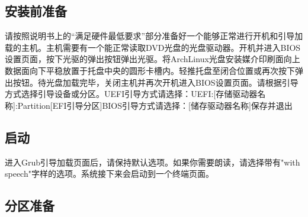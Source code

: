 \documentclass{article}
\newenvironment{singlecolumn}{%
	\par
	\noindent
	\begin{minipage}[t]{\textwidth} %
		\setlength{\parfillskip}{0pt plus 1fil} %
	}{%
	\end{minipage}
	\par
}
\begin{document}
\begin{singlecolumn}
	\vspace*{6\baselineskip} %
	\noindent %
\begin{tcolorbox}
\section*{安装前准备}
\end{tcolorbox}

请按照说明书上的“满足硬件最低要求”部分准备好一个能够正常进行开机和引导加载的主机。主机需要有一个能正常读取DVD光盘的光盘驱动器。开机并进入BIOS设置页面，按下光驱的弹出按钮弹出光驱。将ArchLinux光盘安装媒介印刷面向上数据面向下平稳放置于托盘中央的圆形卡槽内。轻推托盘至闭合位置或再次按下弹出按钮。待光盘加载完毕，关闭主机并再次开机进入BIOS设置页面。请根据引导方式选择引导设备或分区。\textcolor{uefi}{UEFI引导方式请选择：UEFI:[存储驱动器名称]:Partition[EFI引导分区]}\textcolor{bios}{BIOS引导方式请选择：[储存驱动器名称]保存并退出}

\medskip

\begin{tcolorbox}
	\section*{启动}
\end{tcolorbox}

进入Grub引导加载页面后，请保持默认选项。如果你需要朗读，请选择带有"with speech"字样的选项。系统接下来会启动到一个终端页面。

\medskip

\begin{tcolorbox}
	\section*{分区准备}
\end{tcolorbox}


\end{singlecolumn}
\end{document}
